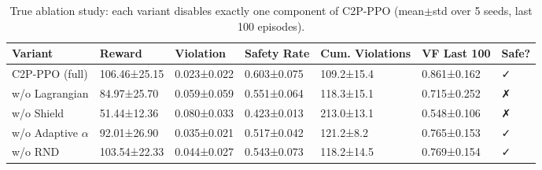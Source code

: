 \begin{table}
\caption{True ablation study: each variant disables exactly one component of C2P-PPO (mean$\pm$std over 5 seeds, last 100 episodes).}
\label{tab:ablation_results}
\begin{tabular}{lllllll}
\toprule
Variant & Reward & Violation & Safety Rate & Cum. Violations & VF Last 100 & Safe? \\
\midrule
C2P-PPO (full) & 106.46±25.15 & 0.023±0.022 & 0.603±0.075 & 109.2±15.4 & 0.861±0.162 & ✓ \\
w/o Lagrangian & 84.97±25.70 & 0.059±0.059 & 0.551±0.064 & 118.3±15.1 & 0.715±0.252 & ✗ \\
w/o Shield & 51.44±12.36 & 0.080±0.033 & 0.423±0.013 & 213.0±13.1 & 0.548±0.106 & ✗ \\
w/o Adaptive $\alpha$ & 92.01±26.90 & 0.035±0.021 & 0.517±0.042 & 121.2±8.2 & 0.765±0.153 & ✓ \\
w/o RND & 103.54±22.33 & 0.044±0.027 & 0.543±0.073 & 118.2±14.5 & 0.769±0.154 & ✓ \\
\bottomrule
\end{tabular}
\end{table}
